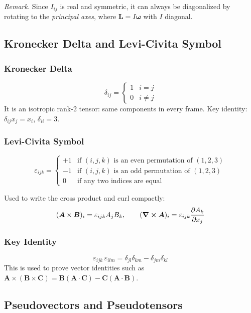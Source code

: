 \documentclass[11pt, letterpaper]{article}
\theoremstyle{plain}
\newenvironment{remark}{\smallskip\noindent\textit{Remark.}}{\smallskip}
\newcommand{\vv}[1]{\bm{#1}}
\begin{document}
\begin{remark}
    Since $I_{ij}$ is real and symmetric, it can always be diagonalized
    by rotating to the \emph{principal axes}, where $\vv{L} = I\vv{\omega}$
    with $I$ diagonal.
\end{remark}


\subsection{Kronecker Delta and Levi-Civita Symbol}

\subsubsection*{Kronecker Delta}
\[
    \delta_{ij} = \begin{cases} 1 & i = j \\ 0 & i \neq j \end{cases}
\]
It is an isotropic rank-2 tensor: same components in every frame.
Key identity: $\delta_{ij}x_j = x_i$, \quad $\delta_{ii} = 3$.

\subsubsection*{Levi-Civita Symbol}
\[
    \varepsilon_{ijk} = \begin{cases}
        +1 & \text{if } (i,j,k) \text{ is an even permutation of } (1,2,3) \\
        -1 & \text{if } (i,j,k) \text{ is an odd permutation of } (1,2,3) \\
        0  & \text{if any two indices are equal}
    \end{cases}
\]

Used to write the cross product and curl compactly:
\[
    (\vv{A}\times\vv{B})_i = \varepsilon_{ijk}A_j B_k, \qquad
    (\curl\vv{A})_i = \varepsilon_{ijk}\pdv{A_k}{x_j}
\]

\subsubsection*{Key Identity}
\[
    \varepsilon_{ijk}\,\varepsilon_{ilm} = \delta_{jl}\delta_{km} - \delta_{jm}\delta_{kl}
\]
This is used to prove vector identities such as
$\vv{A}\times(\vv{B}\times\vv{C}) = \vv{B}(\vv{A}\cdot\vv{C})
- \vv{C}(\vv{A}\cdot\vv{B})$.


\subsection{Pseudovectors and Pseudotensors}
\end{document}
